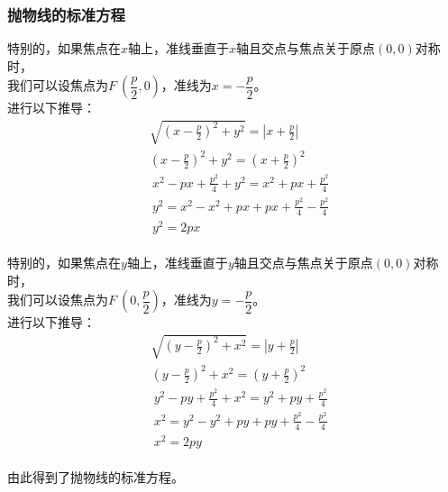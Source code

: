 \documentclass[UTF8]{ctexart}
\begin{document}
\subsubsection{抛物线的标准方程}
    特别的，如果焦点在$x$轴上，准线垂直于$x$轴且交点与焦点关于原点$(0,0)$对称时，\\[2mm]
    我们可以设焦点为$F~(\dfrac{p}{2},0)$，准线为$x=-\dfrac{p}{2}$。\\[4mm]
    进行以下推导：
    \setcounter{equation}{0}
    \begin{align}
        &\sqrt{\left(x-\frac{p}{2}\right)^2+y^2}=\left|x+\frac{p}{2}\right|\\[5mm]
        &\left(x-\frac{p}{2}\right)^2+y^2=\left(x+\frac{p}{2}\right)^2\\[5mm]
        &~x^2-px+\frac{p^2}{4}+y^2=x^2+px+\frac{p^2}{4}\\[5mm]
        &~y^2=x^2-x^2+px+px+\frac{p^2}{4}-\frac{p^2}{4}\\[5mm]
        &~y^2=2px
    \end{align}\\
    特别的，如果焦点在$y$轴上，准线垂直于$y$轴且交点与焦点关于原点$(0,0)$对称时，\\[2mm]
    我们可以设焦点为$F~(0,\dfrac{p}{2})$，准线为$y=-\dfrac{p}{2}$。\\[4mm]
    进行以下推导：
    \setcounter{equation}{0}
    \begin{align}
        &\sqrt{\left(y-\frac{p}{2}\right)^2+x^2}=\left|y+\frac{p}{2}\right|\\[5mm]
        &\left(y-\frac{p}{2}\right)^2+x^2=\left(y+\frac{p}{2}\right)^2\\[5mm]
        &~y^2-py+\frac{p^2}{4}+x^2=y^2+py+\frac{p^2}{4}\\[5mm]
        &~x^2=y^2-y^2+py+py+\frac{p^2}{4}-\frac{p^2}{4}\\[5mm]
        &~x^2=2py
    \end{align}\\
    由此得到了抛物线的标准方程。

\newpage
\end{document}
